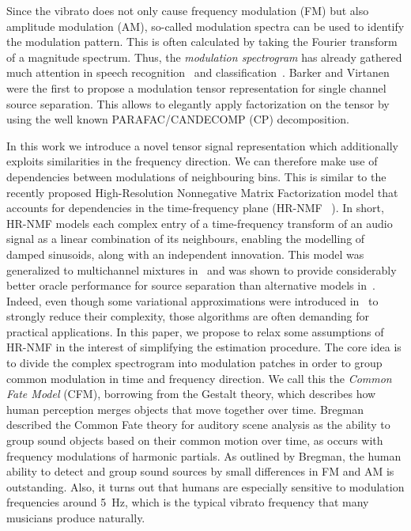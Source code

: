Since the vibrato does not only cause frequency modulation (FM) but also amplitude modulation (AM), so-called modulation spectra can be used to identify the modulation pattern. This is often calculated by taking the Fourier transform of a magnitude spectrum. Thus, the \emph{modulation spectrogram} has already gathered much attention in speech recognition~\cite{greenberg1997modulation,kingsbury1998ASRmodulation} and  classification~\cite{kinnunen2008modulation,markaki2009usingmodulation}.
Barker and Virtanen~\cite{barker2013modulation} were the first to propose a modulation tensor representation for single channel source separation. This allows to elegantly apply factorization on the tensor by using the well known PARAFAC/CANDECOMP (CP) decomposition.

In this work we introduce a novel tensor signal representation which additionally exploits similarities in the frequency direction. We can therefore make use of dependencies between modulations of neighbouring bins. This is similar to the recently proposed High-Resolution Nonnegative Matrix Factorization
model that accounts for dependencies in the time-frequency plane (HR-NMF
~\cite{badeau2011hrnmf}). In short, HR-NMF models each complex entry of a time-frequency transform of an audio signal as a linear combination of its neighbours, enabling the modelling of damped sinusoids, along with an independent
innovation. This model was generalized to multichannel mixtures in~\cite{badeau2013multichannel_hrnmf,badeau2014hrnmfTASLP}
and was shown to provide considerably better oracle performance for source separation than alternative models in~\cite{magron2015hrnmfbenchmark}.
Indeed, even though some variational approximations were introduced
in~\cite{badeau2013variational_hrnmf} to strongly reduce their complexity,
those algorithms are often demanding for practical applications.
In this paper, we propose to relax some assumptions of HR-NMF in the interest of simplifying the estimation procedure. The core idea is to divide the complex spectrogram into modulation patches in order to group common modulation in time and frequency direction. We call this the \emph{Common Fate Model} (CFM), borrowing from the Gestalt theory, which describes how human perception merges objects that move together over time. Bregman~\cite{bregman1994auditory} described the Common Fate theory for auditory scene analysis as the ability to group sound objects based on their common motion over time, as occurs with frequency modulations of harmonic partials. As outlined by Bregman, the human ability to detect and group sound sources by small differences in FM and AM is outstanding. Also, it turns out that humans are especially sensitive to modulation frequencies around 5~Hz, which is the typical vibrato frequency that many musicians produce naturally.




